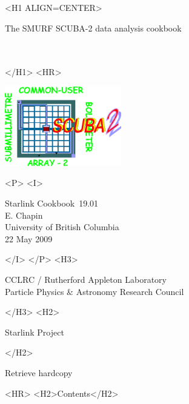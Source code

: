\documentclass[twoside,11pt]{article}
\newcommand{\stardoccategory}  {Starlink Cookbook}
\newcommand{\stardocsource}    {sc\stardocnumber}
\newcommand{\stardocnumber}    {19.01}
\newcommand{\stardocauthors}   {E. Chapin \\ 
University of British Columbia}
\newcommand{\stardocdate}      {22 May 2009}
\newcommand{\stardoctitle}     {The SMURF SCUBA-2 data analysis cookbook}
\newcommand{\stardocversion}   {\ }
\newcommand{\stardocmanual}    {\ }
\newcommand{\htmladdnormallink}[2]{#1}
\newcommand{\htmladdimg}[1]{}
\newcommand{\htmlref}[2]{#1}
\newcommand{\htmladdtonavigation}[1]{}
\newcommand{\xlabel}[1]{}
\renewcommand{\_}{\texttt{\symbol{95}}}
\begin{document}
\begin{htmlonly}
   \xlabel{}
   \begin{rawhtml} <H1 ALIGN=CENTER> \end{rawhtml}
      \stardoctitle\\
      \stardocversion\\
      \stardocmanual
   \begin{rawhtml} </H1> <HR> \end{rawhtml}

\includegraphics[width=2.0in]{sc19_logo.eps}

   \begin{rawhtml} <P> <I> \end{rawhtml}
   \stardoccategory\ \stardocnumber \\
   \stardocauthors \\
   \stardocdate
   \begin{rawhtml} </I> </P> <H3> \end{rawhtml}
      \htmladdnormallink{CCLRC}{http://www.cclrc.ac.uk} /
      \htmladdnormallink{Rutherford Appleton Laboratory}
                        {http://www.cclrc.ac.uk/ral} \\
      \htmladdnormallink{Particle Physics \& Astronomy Research 
Council}
                        {http://www.pparc.ac.uk} \\
   \begin{rawhtml} </H3> <H2> \end{rawhtml}
      \htmladdnormallink{Starlink Project}{http://star-www.rl.ac.uk/}
   \begin{rawhtml} </H2> \end{rawhtml}
   \htmladdnormallink{\htmladdimg{source.gif} Retrieve hardcopy}
      {http://star-www.rl.ac.uk/cgi-bin/hcserver?\stardocsource}\\

  \label{stardoccontents}
  \begin{rawhtml} 
    <HR>
    <H2>Contents</H2>
  \end{rawhtml}
  \htmladdtonavigation{\htmlref{\htmladdimg{contents_motif.gif}}
        {stardoccontents}}


\end{htmlonly}
\end{document}
